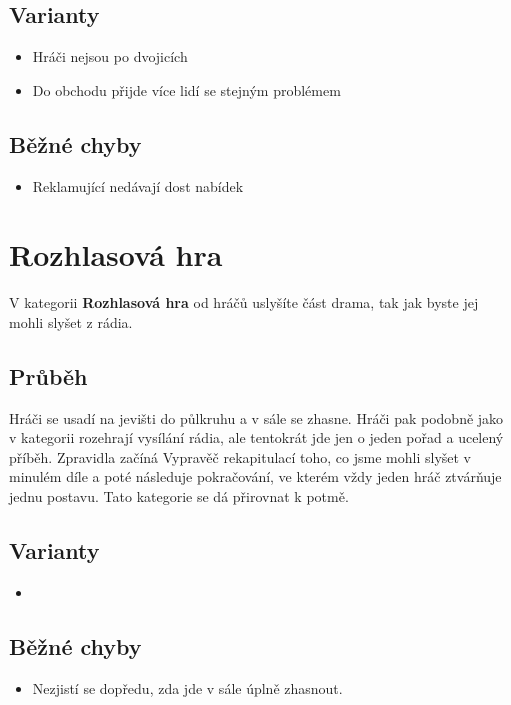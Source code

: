 \subsection{ Varianty } \begin{itemize}
\item  Hráči nejsou po dvojicích
\item  Do obchodu přijde více lidí se stejným problémem
\end{itemize}
 
\subsection{ Běžné chyby } \begin{itemize}
\item  Reklamující nedávají dost nabídek
\end{itemize}
 
 
 
 
 
\needspace{5cm} \section{Rozhlasová hra} \label{rozhlasová hra}  
 
 
V kategorii \textbf{Rozhlasová hra}{} od hráčů uslyšíte část drama, tak jak byste jej mohli slyšet z rádia. 
 
\subsection{Průběh} Hráči se usadí na jevišti do půlkruhu a v sále se zhasne. Hráči pak podobně jako v kategorii  rozehrají vysílání rádia, ale tentokrát jde jen o jeden pořad a ucelený příběh. Zpravidla začíná Vypravěč rekapitulací toho, co jsme mohli slyšet v minulém díle a poté následuje pokračování, ve kterém vždy jeden hráč ztvárňuje jednu postavu. Tato kategorie se dá přirovnat k  potmě. 
 
\subsection{ Varianty } \begin{itemize}
\item {}
\end{itemize}
 
\subsection{ Běžné chyby } \begin{itemize}
\item Nezjistí se dopředu, zda jde v sále úplně zhasnout.
\end{itemize}
 
